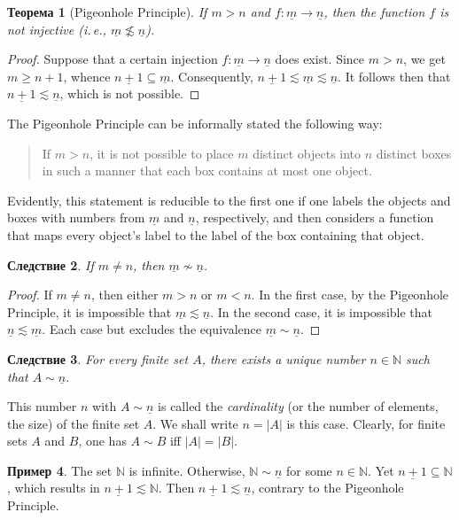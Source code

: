 \documentclass[12pt,notitlepage]{article}
\theoremstyle{plain}
\newtheorem{thm}{Теорема}[section]
\newtheorem{corr}[thm]{Следствие}
\theoremstyle{definition}
\newtheorem{exm}[thm]{Пример}
\theoremstyle{plain}
\newcommand{\N}{\mathbb{N}}
\newcommand{\sbs}{\subseteq}
\newcommand{\ul}[1]{\underline{#1}}
\newcommand{\1}{\mathbf{1}}
\newcommand{\0}{\mathbf{0}}
\begin{document}
\begin{thm}[Pigeonhole Principle]\label{L10:dirichlet}
	If $m > n$ and $f\colon \ul{m} \to \ul{n}$, then the function $f$ is not injective \emph{(}i.\,e., $\ul{m} \not\lesssim \ul{n}$\emph{)}.
\end{thm}
\begin{proof}
	Suppose that a certain injection $f\colon \ul{m} \to \ul{n}$ does exist. Since $m > n$, we get $m \geq n + 1$, whence $\ul{n+1} \sbs \ul{m}$. Consequently, $\ul{n+1} \lesssim \ul{m} \lesssim \ul{n}$. It follows then that $\ul{n+1} \lesssim \ul{n}$, which is not possible.
\end{proof}
\noindent The Pigeonhole Principle can be informally stated the following way:
\begin{quote}
	If $m > n$, it is not possible to place $m$ distinct objects into $n$ distinct boxes in such a manner that each box contains at most one object.
\end{quote}
Evidently, this statement is reducible to the first one if one labels the objects and boxes with numbers from $\ul{m}$ and $\ul{n}$, respectively, and then considers a function that maps   every object's label to the label of the box containing that object.

\begin{corr}
	If $m \neq n$, then $\ul{m} \nsim \ul{n}$.
\end{corr}
\begin{proof}
	If $m \neq n$, then either $m > n$ or $m < n$. In the first case, by the Pigeonhole Principle, it is impossible that $\ul{m} \lesssim \ul{n}$. In the second case, it is impossible that $\ul{n} \lesssim \ul{m}$. Each case but excludes the equivalence $\ul{m} \sim \ul{n}$.
\end{proof}

\begin{corr}
	For every finite set $A$, there exists a \emph{unique} number $n\in \N$ such that $A \sim \ul{n}$.
\end{corr}
This number $n$ with $A \sim \ul{n}$ is called the \emph{cardinality} (or the number of elements, the size) of the finite set $A$. We shall write $n = |A|$ is this case. Clearly, for finite sets $A$ and $B$, one has $A \sim B$ iff $|A| = |B|$.

\begin{exm}\label{L10:N_fin}
	The set $\N$ is infinite. Otherwise, $\N \sim \ul{n}$ for some $n \in \N$. Yet $\ul{n+1} \sbs \N$, which results in $\ul{n+1} \lesssim \N$. Then $\ul{n+1} \lesssim \ul{n}$, contrary to the Pigeonhole Principle.
\end{exm}
\end{document}
